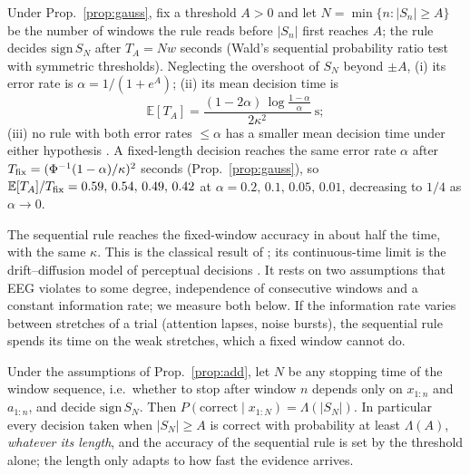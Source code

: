 \begin{proposition}\label{prop:sprt}
Under Prop.~\ref{prop:gauss}, fix a threshold $A>0$ and let
$N=\min\{n:|S_n|\ge A\}$ be the number of windows the rule reads before
$|S_n|$ first reaches $A$; the rule decides $\mathrm{sign}\,S_N$ after $T_A=Nw$ seconds
(Wald's sequential probability ratio test with symmetric thresholds). Neglecting the overshoot
of $S_N$ beyond $\pm A$, (i) its error rate is $\alpha=1/(1+e^{A})$; (ii) its mean decision
time is
\[\mathbb E[T_A]=\frac{(1-2\alpha)\,\log\frac{1-\alpha}{\alpha}}{2\kappa^2}\ \text{s};\]
(iii) no rule with both error rates $\le\alpha$ has a smaller mean decision time under
either hypothesis \citep{wald1948optimum}. A fixed-length decision reaches the same error rate
$\alpha$ after $T_{\rm fix}=(\Phi^{-1}(1-\alpha)/\kappa)^2$ seconds (Prop.~\ref{prop:gauss}),
so $\mathbb E[T_A]/T_{\rm fix}=0.59,\,0.54,\,0.49,\,0.42$ at $\alpha=0.2,\,0.1,\,0.05,\,0.01$,
decreasing to $1/4$ as $\alpha\to0$.
\end{proposition}
The sequential rule reaches the fixed-window accuracy in about half the time, with the
same $\kappa$. This is the classical result of \citet{wald1945sequential}; its continuous-time
limit is the drift--diffusion model of perceptual decisions \citep{bogacz2006physics}. It
rests on two assumptions that EEG violates to some degree, independence of consecutive
windows and a constant information rate; we measure both below. If the information rate varies
between stretches of a trial (attention lapses, noise bursts), the sequential rule spends its
time on the weak stretches, which a fixed window cannot do.

\begin{proposition}\label{prop:stop}
Under the assumptions of Prop.~\ref{prop:add}, let $N$ be any stopping time of the window
sequence, i.e.\ whether to stop after window $n$ depends only on $x_{1:n}$ and $a_{1:n}$, and
decide $\mathrm{sign}\,S_N$. Then $P(\text{correct}\mid x_{1:N})=\Lambda(|S_N|)$. In particular
every decision taken when $|S_N|\ge A$ is correct with probability at least $\Lambda(A)$,
\emph{whatever its length}, and the accuracy of the sequential rule is set by the threshold
alone; the length only adapts to how fast the evidence arrives.
\end{proposition}

